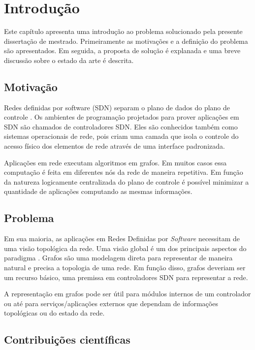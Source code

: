 \chapter{Introdução}
\label{chap:introduction}

Este capítulo apresenta uma introdução ao problema solucionado pela 
presente dissertação de mestrado. 
Primeiramente as motivações e a definição do problema são apresentados. 
Em seguida, a proposta de solução é explanada e uma breve discussão sobre 
o estado da arte é descrita.

\section{Motivação}

Redes definidas por software (SDN) separam o plano de dados do plano 
de controle \citep{guedes2012redes}.
Os ambientes de programação projetados para prover aplicações em SDN são 
chamados de controladores SDN.
Eles são conhecidos também como sistemas operacionais de rede, pois criam uma
camada que isola o controle do acesso físico dos elementos de rede através 
de uma interface padronizada.

Aplicações em rede executam algoritmos em grafos.
Em muitos casos essa computação é feita em diferentes nós da rede de maneira 
repetitiva.
Em função da natureza logicamente centralizada do plano de controle é possível
minimizar a quantidade de aplicações computando as mesmas informações.

\section{Problema}

Em sua maioria, as aplicações em Redes Definidas por \emph{Software} necessitam
de uma visão topológica da rede.
Uma visão global é um dos principais aspectos do paradigma 
\citep{martin2010virtualizing}.
Grafos são uma modelagem direta para representar de maneira natural e precisa 
a topologia de uma rede.
Em função disso, grafos deveriam ser um recurso básico, uma premissa em 
controladores SDN para representar a rede.

A representação em grafos pode ser útil para módulos internos de um controlador
ou até para serviços/aplicações externos que dependam de informações 
topológicas ou do estado da rede.

\section{Contribuições científicas}

